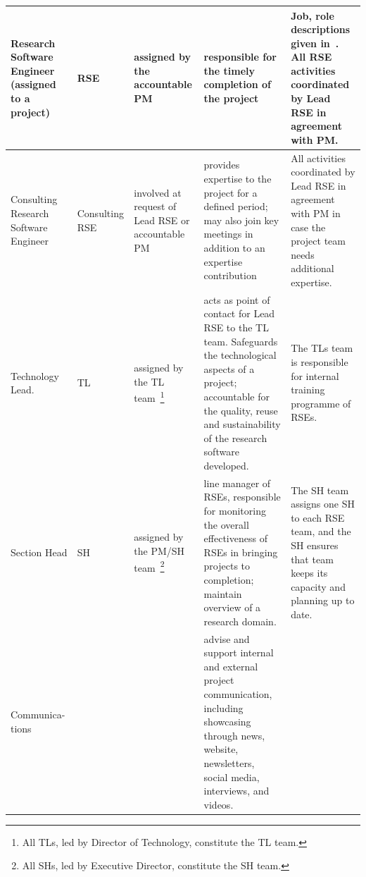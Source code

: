 \begin{tabularx}{\linewidth}{p{}|p{}|p{}|p{}|p{}}
Research Software Engineer (assigned to a project) & RSE                   & assigned by the accountable PM                                                                                    & responsible for the timely completion of the project                                                                                                                                                                                   & Job, role descriptions given in~\cite{rse,rse-job}. All RSE activities coordinated by Lead RSE in agreement with PM.                                                                     \\\hline
Consulting Research Software Engineer              & Consulting RSE        & involved at request of Lead RSE or accountable PM                                                                 & provides expertise to the project for a defined period; may also join key meetings in addition to an expertise contribution                                                        & All activities coordinated by Lead RSE in agreement with PM in case the project team needs additional expertise.                     \\\hline
Technology Lead.                                    & TL                    & assigned by the TL team~\footnote{All TLs, led by Director of Technology, constitute the TL team.}                & acts as point of contact for Lead RSE to the TL team. Safeguards the technological aspects of a project; accountable for the quality, reuse and sustainability of the research software developed.                                     & The TLs team is responsible for internal training programme of RSEs.                                                                 \\\hline
Section Head                                       & SH                    & assigned by the PM/SH team~\footnote{All SHs, led by Executive Director, constitute the SH team.}                 & line manager of RSEs, responsible for monitoring the overall effectiveness of RSEs in bringing projects to completion; maintain overview of a research domain.                                                                         & The SH team assigns one SH to each RSE team, and the SH ensures that team keeps its capacity and planning up to date.                \\\hline
Communica-tions                                     &                       &                                                                                                                   & advise and support internal and external project communication, including showcasing through news, website, newsletters, social media, interviews, and videos.                                &                                                                                                                                      \\\hline

\end{tabularx}
